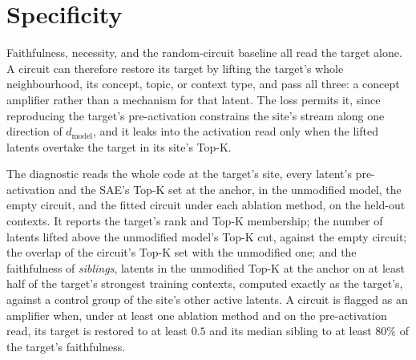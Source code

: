 \documentclass[10pt]{article}
\begin{document}
\section{Specificity}
\label{app:specificity}

Faithfulness, necessity, and the random-circuit baseline all read the target alone.
A circuit can therefore restore its target by lifting the target's whole neighbourhood, its concept, topic, or context type, and pass all three: a concept amplifier rather than a mechanism for that latent.
The loss permits it, since reproducing the target's pre-activation constrains the site's stream along one direction of $d_{\mathrm{model}}$, and it leaks into the activation read only when the lifted latents overtake the target in its site's Top-K.

The diagnostic reads the whole code at the target's site, every latent's pre-activation and the SAE's Top-K set at the anchor, in the unmodified model, the empty circuit, and the fitted circuit under each ablation method, on the held-out contexts.
It reports the target's rank and Top-K membership; the number of latents lifted above the unmodified model's Top-K cut, against the empty circuit; the overlap of the circuit's Top-K set with the unmodified one; and the faithfulness of \emph{siblings}, latents in the unmodified Top-K at the anchor on at least half of the target's strongest training contexts, computed exactly as the target's, against a control group of the site's other active latents.
A circuit is flagged as an amplifier when, under at least one ablation method and on the pre-activation read, its target is restored to at least $0.5$ and its median sibling to at least $80\%$ of the target's faithfulness.
\end{document}
